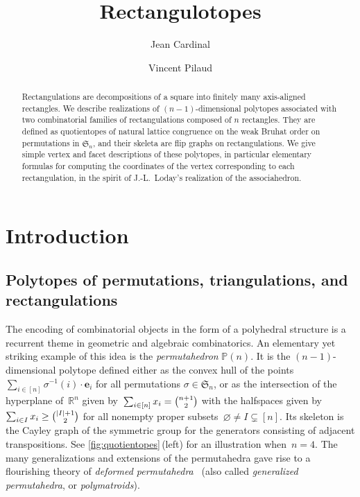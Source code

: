 \documentclass{amsart}
\title{Rectangulotopes}
\author{Jean Cardinal}
\author{Vincent Pilaud}
\theoremstyle{definition}
\newcommand{\R}{\mathbb{R}} %
\renewcommand{\b}[1]{{\boldsymbol{#1}}} %
\newcommand{\f}[1]{\mathfrak{#1}} %
\newcommand{\darkblue}{\color{darkblue}} %
\newcommand{\defn}[1]{\textsl{\darkblue #1}} %
\newcommand{\polytope}[1]{\mathds{#1}} %
\newcommand{\Perm}{\polytope{P}} %
\begin{document}
\begin{abstract}
  Rectangulations are decompositions of a square into finitely many axis-aligned rectangles.
  We describe realizations of $(n-1)$-dimensional polytopes associated with two combinatorial families of rectangulations composed of $n$ rectangles.
  They are defined as quotientopes of natural lattice congruence on the weak Bruhat order on permutations in $\f{S}_n$, and their skeleta are flip graphs on rectangulations.
  We give simple vertex and facet descriptions of these polytopes, in particular elementary formulas for computing the coordinates of the vertex corresponding to each rectangulation, in the spirit of J.-L.~Loday's realization of the associahedron.
\end{abstract}

\maketitle

\tableofcontents


\section{Introduction}
\label{sec:intro}


\subsection{Polytopes of permutations, triangulations, and rectangulations}
\label{subsec:permTrianRect}

The encoding of combinatorial objects in the form of a polyhedral structure is a recurrent theme in geometric and algebraic combinatorics.
An elementary yet striking example of this idea is the \defn{permutahedron} $\Perm (n)$.
It is the $(n-1)$-dimensional polytope defined either as the convex hull of the points $\sum_{i\in [n]} \sigma^{-1}(i)\cdot \b{e}_i$ for all permutations $\sigma \in \f{S}_n$, or as the intersection of the hyperplane of~$\R^n$ given by~$\sum_{i \in [n]} x_i = \smash{\binom{n+1}{2}}$ with the halfspaces given by~$\sum_{i \in I} x_i \ge \smash{\binom{|I|+1}{2}}$ for all nonempty proper subsets~$\varnothing \ne I \subsetneq [n]$.
Its skeleton is the Cayley graph of the symmetric group for the generators consisting of adjacent transpositions.
See \cref{fig:quotientopes}\,(left) for an illustration when~$n = 4$.
The many generalizations and extensions of the permutahedra gave rise to a flourishing theory of \defn{deformed permutahedra}~\cite{MR2520477,Postnikov,MR4064768,MR4651496} (also called \defn{generalized permutahedra}, or \defn{polymatroids}).
\end{document}
